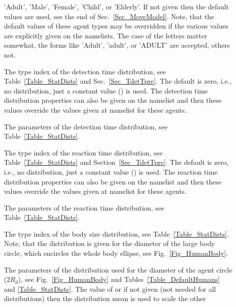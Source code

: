 \documentclass[12pt,a4paper,final,twoside]{stylevk}
\begin{document}
\begin{description}
%
\item[] 'Adult', 'Male', 'Female', 'Child',
  or 'Elderly'.  If not given then the default values are used, see
  the end of Sec.~\ref{Sec_MoveModel}.  Note, that the default values
  of these agent types may be overridden if the various values are
  explicitly given on the  namelists.  The case of the
  letters matter somewhat, the forms like 'Adult', 'adult', or 'ADULT'
  are accepted, others not.
%
\item[] The type index of the detection time
  distribution, see Table~\ref{Table_StatDists} and
  Sec.~\ref{Sec_TdetTpre}.  The default is zero, i.e., no
  distribution, just a constant value () is used.
  The detection time distribution properties can also be given on the
   namelist and then these values override the values
  given at  namelist for these agents.
%
\item[] The
  parameters of the detection time distribution, see
  Table~\ref{Table_StatDists}.
%
\item[] The type index of the reaction time
  distribution, see Table~\ref{Table_StatDists} and
  Section~\ref{Sec_TdetTpre}.  The default is zero, i.e., no
  distribution, just a constant value () is used.
  The reaction time distribution properties can also be given on the
   namelist and then these values override the values
  given at  namelist for these agents.
%
\item[] The
  parameters of the reaction time distribution, see
  Table~\ref{Table_StatDists}.
%
\item[] The type index of the body size
  distribution, see Table~\ref{Table_StatDists}.  Note, that the
  distribution is given for the diameter of the large body circle,
  which encircles the whole body ellipse, see
  Fig.~\ref{Fig_HumanBody}.
%
\item[] The
  parameters of the distribution used for the diameter of the agent
  circle ($2R_d$), see Fig.~\ref{Fig_HumanBody} and
  Tables~\ref{Table_DefaultHumans} and \ref{Table_StatDists}.  The
  value of  or if not given (not needed for all
  distributions) then the distribution mean is used to scale the other

\end{description}
\end{document}

